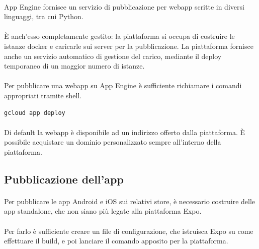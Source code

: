 \documentclass[11pt,a4paper,english]{article}
\begin{document}
\paragraph{} App Engine fornisce un servizio di pubblicazione per webapp scritte in diversi linguaggi, tra cui Python. 

\paragraph{} È anch'esso completamente gestito: la piattaforma si occupa di costruire le istanze docker e caricarle sui server per la pubblicazione. La piattaforma fornisce anche un servizio automatico di gestione del carico, mediante il deploy temporaneo di un maggior numero di istanze. 

\paragraph{} Per pubblicare una webapp su App Engine è sufficiente richiamare i comandi appropriati tramite shell. 

\begin{lstlisting}[caption=Pubblicazione della webapp su App Engine]
gcloud app deploy
\end{lstlisting}

\paragraph{} Di default la webapp è disponibile ad un indirizzo offerto dalla piattaforma. È possibile acquistare un dominio personalizzato sempre all'interno della piattaforma.

\subsection{Pubblicazione dell'app}

\paragraph{} Per pubblicare le app Android e iOS sui relativi store, è necessario costruire delle app standalone, che non siano più legate alla piattaforma Expo. 

\paragraph{} Per farlo è sufficiente creare un file di configurazione, che istruisca Expo su come effettuare il build, e poi lanciare il comando apposito per la piattaforma. 
\end{document}
